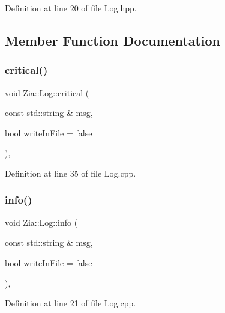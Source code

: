 Definition at line 20 of file Log.\+hpp.



\subsection{Member Function Documentation}
\mbox{\label{class_zia_1_1_log_a5a7899f592f85e1da39e90ba32eef98b}} 
\subsubsection{\texorpdfstring{critical()}{critical()}}
{\footnotesize\ttfamily void Zia\+::\+Log\+::critical (\begin{DoxyParamCaption}\item[{const std\+::string \&}]{msg,  }\item[{bool}]{write\+In\+File = {\ttfamily false} }\end{DoxyParamCaption})\hspace{0.3cm}{\ttfamily [static]}, {\ttfamily [noexcept]}}



Definition at line 35 of file Log.\+cpp.

\mbox{\label{class_zia_1_1_log_a7abad30f76aea6c210ae245885f05137}} 
\subsubsection{\texorpdfstring{info()}{info()}}
{\footnotesize\ttfamily void Zia\+::\+Log\+::info (\begin{DoxyParamCaption}\item[{const std\+::string \&}]{msg,  }\item[{bool}]{write\+In\+File = {\ttfamily false} }\end{DoxyParamCaption})\hspace{0.3cm}{\ttfamily [static]}, {\ttfamily [noexcept]}}



Definition at line 21 of file Log.\+cpp.

\mbox{\label{class_zia_1_1_log_ae26eb7733ba9cda16a36d2ad25c93bd4}} 
